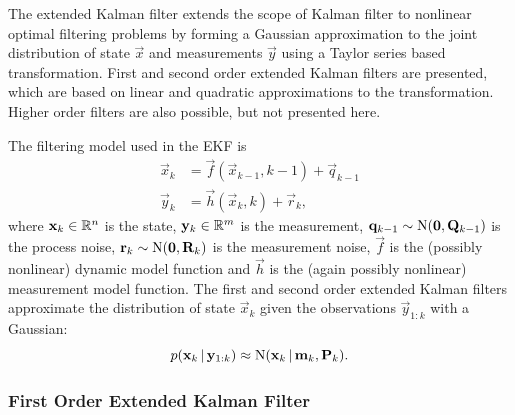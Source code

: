 The extended Kalman filter \citep[see, for instance, ][]{Jazwinski:1966,
Maybeck:1982,Bar-Shalom+Li+Kirubarajan:2001,Grewal+Andrews:2001,Sarkka:2006} extends the scope of Kalman filter to nonlinear optimal
filtering problems by forming a Gaussian approximation to the joint
distribution of state $\vec{x}$ and measurements $\vec{y}$ using a
Taylor series based transformation. First and second order extended
Kalman filters are presented, which are based on linear and quadratic
approximations to the transformation. Higher order filters are also
possible, but not presented here.


The filtering model used in the EKF is
%
\begin{equation}
\begin{split}
\vec{x}_{k} &= \vec{f}(\vec{x}_{k-1},k-1) + \vec{q}_{k-1} \\
\vec{y}_{k} &= \vec{h}(\vec{x}_{k},k) + \vec{r}_{k},
\end{split} \label {eq:nonlinear_prob}
\end{equation}
%
where $\mathbf{x}_k \in \mathbb{R}^n$ is the state, $\mathbf{y}_k \in
\mathbb{R}^m$ is the measurement, $\mathbf{q}_{k-1} \sim
\operatorname{N}(\mathbf{0},\mathbf{Q}_{k-1})$ is the process noise, $\mathbf{r}_{k} \sim
\operatorname{N}(\mathbf{0},\mathbf{R}_{k})$ is the measurement noise, $\vec{f}$ is the
(possibly nonlinear) dynamic model function and $\vec{h}$ is the
(again possibly nonlinear) measurement model function. The first and
second order extended Kalman filters approximate the distribution of
state $\vec{x}_k$ given the observations $\vec{y}_{1:k}$ with a
Gaussian:
%
\begin{equation}
  p(\mathbf{x}_{k}\,|\,\mathbf{y}_{1:k}) \approx
    \operatorname{N}(\mathbf{x}_{k}\,|\,\mathbf{m}_{k},\mathbf{P}_{k}).
\end{equation}
%

\subsubsection{First Order Extended Kalman Filter}


